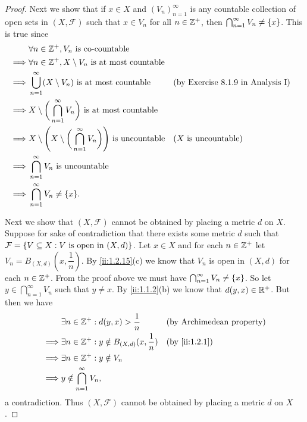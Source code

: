 \begin{proof}
  Next we show that if \(x \in X\) and \((V_n)_{n = 1}^\infty\) is any countable collection of open sets in \((X, \mathcal{F})\) such that \(x \in V_n\) for all \(n \in \mathbb{Z}^+\), then \(\bigcap_{n = 1}^\infty V_n \neq \left\lbrace x\right\rbrace\).
  This is true since
  \begin{align*}
             & \forall n \in \Z^+, V_n \text{ is co-countable}                                                                                                 \\
    \implies & \forall n \in \Z^+, X \setminus V_n \text{ is at most countable}                                                                                \\
    \implies & \bigcup_{n = 1}^\infty (X \setminus V_n) \text{ is at most countable}                             &  & \text{(by Exercise 8.1.9 in Analysis I)} \\
    \implies & X \setminus \bigg(\bigcap_{n = 1}^\infty V_n\bigg) \text{ is at most countable}                                                                 \\
    \implies & X \setminus \Bigg(X \setminus \bigg(\bigcap_{n = 1}^\infty V_n\bigg)\Bigg) \text{ is uncountable} &  & \text{(\(X\) is uncountable)}            \\
    \implies & \bigcap_{n = 1}^\infty V_n \text{ is uncountable}                                                                                               \\
    \implies & \bigcap_{n = 1}^\infty V_n \neq \set{x}.
  \end{align*}

  Next we show that \((X, \mathcal{F})\) cannot be obtained by placing a metric \(d\) on \(X\).
  Suppose for sake of contradiction that there exists some metric \(d\) such that \(\mathcal{F} = \left\lbrace V \subseteq X : V \text{ is open in } (X, d)\right\rbrace\).
  Let \(x \in X\) and for each \(n \in \mathbb{Z}^+\) let \(V_n = B_{(X, d)}(x, \dfrac{1}{n})\).
  By \cref{ii:1.2.15}(c) we know that \(V_n\) is open in \((X, d)\) for each \(n \in \mathbb{Z}^+\).
  From the proof above we must have \(\bigcap_{n = 1}^\infty V_n \neq \left\lbrace x\right\rbrace\).
  So let \(y \in \bigcap_{n = 1}^\infty V_n\) such that \(y \neq x\).
  By \cref{ii:1.1.2}(b) we know that \(d(y, x) \in \mathbb{R}^+\).
  But then we have
  \begin{align*}
             & \exists n \in \Z^+ : d(y, x) > \dfrac{1}{n}               &  & \text{(by Archimedean property)} \\
    \implies & \exists n \in \Z^+ : y \notin B_{(X, d)}(x, \dfrac{1}{n}) &  & \by{ii:1.2.1}                       \\
    \implies & \exists n \in \Z^+ : y \notin V_n                                                               \\
    \implies & y \notin \bigcap_{n = 1}^\infty V_n,
  \end{align*}
  a contradiction.
  Thus \((X, \mathcal{F})\) cannot be obtained by placing a metric \(d\) on \(X\).


\end{proof}
